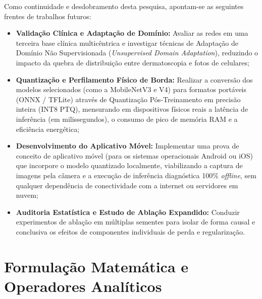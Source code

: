 \documentclass[oneside,english,brazilian]{UNISINOSmonografia}
\begin{document}
Como continuidade e desdobramento desta pesquisa, apontam-se as seguintes frentes de trabalhos futuros:
\begin{itemize}
    \item \textbf{Validação Clínica e Adaptação de Domínio:} Avaliar as redes em uma terceira base clínica multicêntrica e investigar técnicas de Adaptação de Domínio Não Supervisionada (\textit{Unsupervised Domain Adaptation}), reduzindo o impacto da quebra de distribuição entre dermatoscopia e fotos de celulares;
    \item \textbf{Quantização e Perfilamento Físico de Borda:} Realizar a conversão dos modelos selecionados (como a MobileNetV3 e V4) para formatos portáveis (ONNX / TFLite) através de Quantização Pós-Treinamento em precisão inteira (INT8 PTQ), mensurando em dispositivos físicos reais a latência de inferência (em milissegundos), o consumo de pico de memória RAM e a eficiência energética;
    \item \textbf{Desenvolvimento do Aplicativo Móvel:} Implementar uma prova de conceito de aplicativo móvel (para os sistemas operacionais Android ou iOS) que incorpore o modelo quantizado localmente, viabilizando a captura de imagens pela câmera e a execução de inferência diagnóstica 100\% \textit{offline}, sem qualquer dependência de conectividade com a internet ou servidores em nuvem;
    \item \textbf{Auditoria Estatística e Estudo de Ablação Expandido:} Conduzir experimentos de ablação em múltiplas sementes para isolar de forma causal e conclusiva os efeitos de componentes individuais de perda e regularização.
\end{itemize}

\nocite{gemini2026}


\appendix
\chapter{Formulação Matemática e Operadores Analíticos}
\label{apendice:formulacao_matematica}
\end{document}
